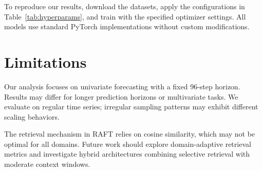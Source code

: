 \documentclass{article} %
\begin{document}
To reproduce our results, download the datasets, apply the configurations in Table~\ref{tab:hyperparams}, and train with the specified optimizer settings. All models use standard PyTorch implementations without custom modifications.

\section{Limitations}

Our analysis focuses on univariate forecasting with a fixed 96-step horizon. Results may differ for longer prediction horizons or multivariate tasks. We evaluate on regular time series; irregular sampling patterns may exhibit different scaling behaviors.

The retrieval mechanism in RAFT relies on cosine similarity, which may not be optimal for all domains. Future work should explore domain-adaptive retrieval metrics and investigate hybrid architectures combining selective retrieval with moderate context windows.
\end{document}
